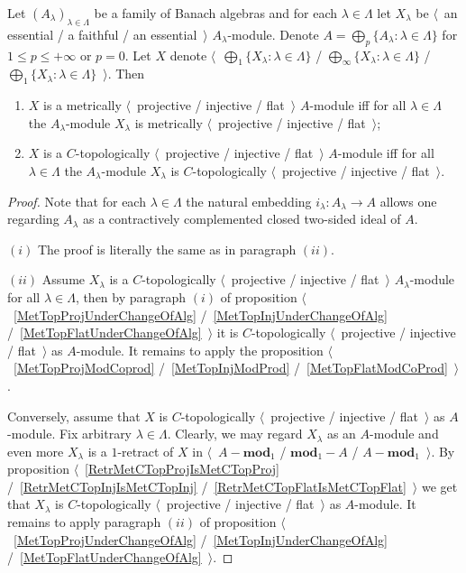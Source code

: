 \begin{proposition}\label{MetTopProjInjFlatUnderSumOfAlg} Let
${(A_\lambda)}_{\lambda\in\Lambda}$ be a family of Banach algebras and for each
$\lambda\in\Lambda$ let $X_\lambda$ be $\langle$~an essential / a faithful / an
essential~$\rangle$ $A_\lambda$-module. Denote $A=\bigoplus_p
\{A_\lambda:\lambda\in\Lambda \}$ for $1\leq p\leq +\infty$ or $p=0$. Let $X$
denote $\langle$~$\bigoplus_1 \{X_\lambda:\lambda\in\Lambda \}$ /
$\bigoplus_\infty \{X_\lambda:\lambda\in\Lambda \}$ / 
$\bigoplus_1 \{X_\lambda:\lambda\in\Lambda \}$~$\rangle$. Then

\begin{enumerate}[label = (\roman*)]
    \item $X$ is a metrically $\langle$~projective / injective / flat~$\rangle$
    $A$-module iff for all $\lambda\in\Lambda$ the $A_\lambda$-module
    $X_\lambda$ is metrically $\langle$~projective / injective / flat~$\rangle$;

    \item $X$ is a $C$-topologically $\langle$~projective / injective /
    flat~$\rangle$ $A$-module iff for all $\lambda\in\Lambda$ the
    $A_\lambda$-module $X_\lambda$ is $C$-topologically $\langle$~projective /
    injective / flat~$\rangle$.
\end{enumerate}
\end{proposition}
\begin{proof} Note that for each $\lambda\in\Lambda$ the natural embedding
$i_\lambda:A_\lambda\to A$ allows one regarding $A_\lambda$ as a contractively 
complemented closed two-sided ideal of $A$.

$(i)$ The proof is literally the same as in paragraph $(ii)$.

$(ii)$ Assume $X_\lambda$ is a $C$-topologically $\langle$~projective / injective
/ flat~$\rangle$ $A_\lambda$-module for all $\lambda\in\Lambda$, then by
paragraph $(i)$ of proposition $\langle$~\ref{MetTopProjUnderChangeOfAlg}
/~\ref{MetTopInjUnderChangeOfAlg} /~\ref{MetTopFlatUnderChangeOfAlg}~$\rangle$
it is $C$-topologically $\langle$~projective / injective / flat~$\rangle$ as
$A$-module. It remains to apply the proposition
$\langle$~\ref{MetTopProjModCoprod} /~\ref{MetTopInjModProd}
/~\ref{MetTopFlatModCoProd}~$\rangle$. 

Conversely, assume that $X$ is $C$-topologically $\langle$~projective /
injective / flat~$\rangle$ as $A$-module. Fix arbitrary $\lambda\in\Lambda$.
Clearly, we may regard $X_\lambda$ as an $A$-module and even more $X_\lambda$ is a
$1$-retract of $X$ in $\langle$~$A-\mathbf{mod}_1$ / $\mathbf{mod}_1-A$ /
$A-\mathbf{mod}_1$~$\rangle$. By proposition
$\langle$~\ref{RetrMetCTopProjIsMetCTopProj} /~\ref{RetrMetCTopInjIsMetCTopInj}
/~\ref{RetrMetCTopFlatIsMetCTopFlat}~$\rangle$ we get that $X_\lambda$ is
$C$-topologically $\langle$~projective / injective / flat~$\rangle$ as
$A$-module. It remains to apply paragraph $(ii)$ of proposition
$\langle$~\ref{MetTopProjUnderChangeOfAlg} /~\ref{MetTopInjUnderChangeOfAlg}
/~\ref{MetTopFlatUnderChangeOfAlg}~$\rangle$.
\end{proof} 

